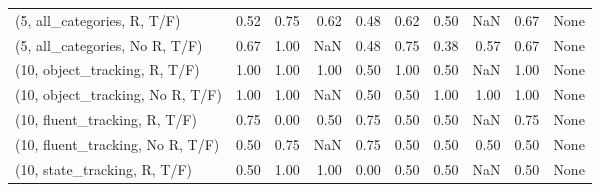 \begin{table*}[h!]
\begin{adjustbox}{width=2\columnwidth,center}
\begin{tabular}{lrrr|rrr|rrr}
(5, all\_categories, R, T/F)          &                      0.52 &                  0.75 &                      0.62 &                          0.48 &                      0.62 &                          0.50 &                                    NaN &                               0.67 &                                  None \\
(5, all\_categories, No R, T/F)       &                      0.67 &                  1.00 &                       NaN &                          0.48 &                      0.75 &                          0.38 &                                   0.57 &                               0.67 &                                  None \\



\midrule
(10, object\_tracking, R, T/F)         &                      1.00 &                  1.00 &                      1.00 &                          0.50 &                      1.00 &                          0.50 &                                    NaN &                               1.00 &                                  None \\
(10, object\_tracking, No R, T/F)      &                      1.00 &                  1.00 &                       NaN &                          0.50 &                      0.50 &                          1.00 &                                   1.00 &                               1.00 &                                  None \\
(10, fluent\_tracking, R, T/F)         &                      0.75 &                  0.00 &                      0.50 &                          0.75 &                      0.50 &                          0.50 &                                    NaN &                               0.75 &                                  None \\
(10, fluent\_tracking, No R, T/F)      &                      0.50 &                  0.75 &                       NaN &                          0.75 &                      0.50 &                          0.50 &                                   0.50 &                               0.50 &                                  None \\
(10, state\_tracking, R, T/F)          &                      0.50 &                  1.00 &                      1.00 &                          0.00 &                      0.50 &                          0.50 &                                    NaN &                               0.50 &                                  None \\

\end{tabular}
\end{adjustbox}
\end{table*}
